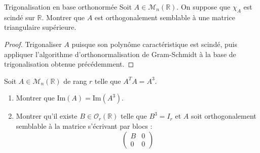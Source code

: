 \documentclass[french,a4paper]{article}
\newcommand{\R}{\mathbb{R}}
\theoremstyle{plain}
\theoremstyle{definition}
\theoremstyle{remark}
\begin{document}
\begin{ex}{Trigonalisation en base orthonormée}
	Soit $A\in\mathcal{M}_n(\R)$. On suppose que $\chi_A$ est scindé sur $\R$. Montrer que $A$ est orthogonalement semblable à une matrice triangulaire supérieure.
\end{ex}
\begin{proof}
	Trigonaliser $A$ puisque son polynôme caractéristique est scindé, puis appliquer l'algorithme d'orthonormalisation de Gram-Schmidt à la base de trigonalisation obtenue précédemment.
\end{proof}

\begin{ex}{}
	Soit $A\in\mathcal{M}_n(\R)$ de rang $r$ telle que $A^TA=A^3$.
	\begin{enumerate}
		\item Montrer que $\text{Im}(A)=\text{Im}(A^3)$.
		\item Montrer qu'il existe $B\in\mathcal{O}_r(\R)$ telle que $B^3=I_r$ et $A$ soit orthogonalement semblable à la matrice s'écrivant par blocs : $$\begin{pmatrix}
			B&0\\
			0&0
		\end{pmatrix}$$
	\end{enumerate}
\end{ex}
\end{document}

